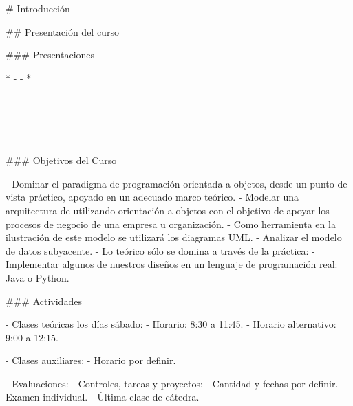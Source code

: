 # Introducción

## Presentación del curso

### Presentaciones

* 
    - 
    - 
    \pause
* 
    \pause

    \vspace{-6mm}
    \begin{center}
    \hspace{20mm}\begin{customRoundedBox}{}
    \centering
        \\
        \vspace{4mm}
        \\
    \end{customRoundedBox}
    
    \hspace{60mm}\begin{customRoundedBox}{}
    \centering
        \\
    \end{customRoundedBox}
    \end{center}

### Objetivos del Curso

- Dominar el paradigma de programación orientada a objetos, desde un punto de vista 
  práctico, apoyado en un adecuado marco teórico.
  \pause
- Modelar una arquitectura de  utilizando orientación a objetos
  con el objetivo de apoyar los procesos de negocio
  de una empresa u organización.
  \pause
- Como herramienta en la ilustración de este modelo se utilizará los diagramas UML.
  \pause
- Analizar el modelo de datos subyacente.
  \pause
- Lo teórico sólo se domina a través de la práctica: 
    - Implementar algunos de nuestros diseños en un lenguaje de programación real: Java o Python.

### Actividades

- Clases teóricas los días sábado:
    - Horario: 8:30 a 11:45.
    - Horario alternativo: 9:00 a 12:15.

- Clases auxiliares:
    - Horario por definir.

- Evaluaciones:
    - Controles, tareas y proyectos:
        - Cantidad y fechas por definir.
    - Examen individual.
        - Última clase de cátedra.


